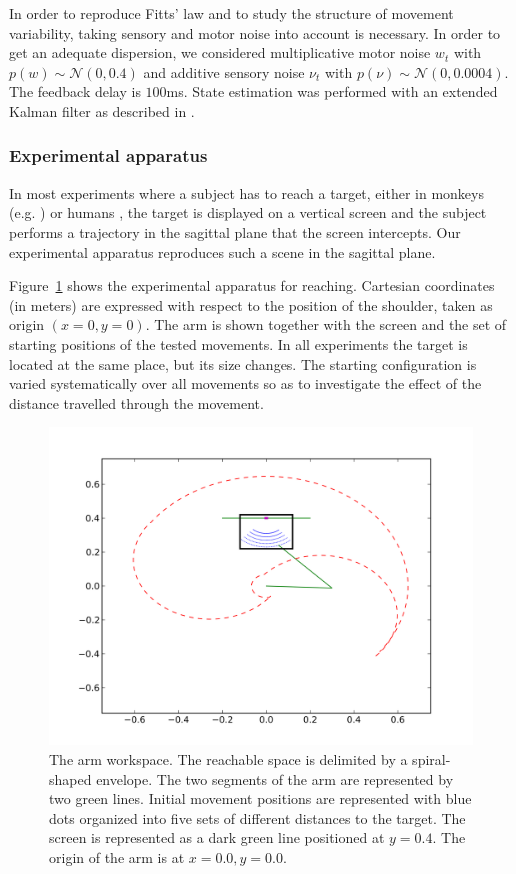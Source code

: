 \documentclass[10pt]{article}
\begin{document}
In order to reproduce Fitts' law and to study the structure of movement variability, taking sensory and motor noise into account is necessary. 
In order to get an adequate dispersion, we considered multiplicative motor noise $w_t$ with $p(w) \sim \mathcal{N}(0, 0.4)$ and additive sensory noise $\nu_t$ with $p(\nu) \sim \mathcal{N}(0, 0.0004)$. The feedback delay is $100$ms.
State estimation was performed with an extended Kalman filter as described in \cite{guigon08a}. 

\subsubsection{Experimental apparatus}
\label{sec:apparatus}

In most experiments where a subject has to reach a target, either in monkeys (e.g. \cite{kitazawa98}) or humans \cite{Trommershauser2003a,Dean2007,Battaglia2007,Hudson2008,Trommershauser2009}, the target is displayed on a vertical screen and the subject performs a trajectory in the sagittal plane that the screen intercepts.
Our experimental apparatus reproduces such a scene in the sagittal plane.

Figure~\ref{fig:arm_workspace} shows the experimental apparatus for reaching.
Cartesian coordinates (in meters) are expressed with 
respect to the position of the shoulder, taken as origin $(x=0, y=0)$.
The arm is shown together with the screen and the set of starting positions of the tested movements. In all experiments the target is located at the same place, but its size changes. The starting configuration is varied systematically over all movements so as to investigate the effect of the distance travelled through the movement.

\begin{figure}[t]
\centering
	\includegraphics[width=0.8\columnwidth]{images/workspace}
	\caption{The arm workspace.
The reachable space is delimited by a spiral-shaped envelope. 
The two segments of the arm are represented by two green lines. 
Initial movement positions are represented with blue dots organized into five sets of different distances to the target. 
The screen is represented as a dark green line positioned at $y=0.4$.
The origin of the arm is at $x=0.0,y=0.0$.
\label{fig:arm_workspace}}	
\end{figure}
\end{document}
